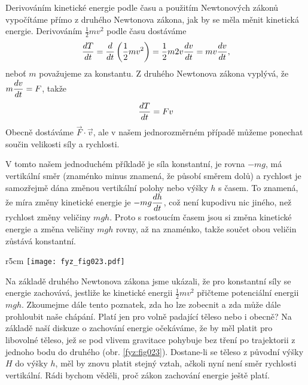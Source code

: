     Derivováním kinetické energie podle času a použitím Newtonových zákonů vypočítáme přímo z 
    druhého Newtonova zákona, jak by se měla měnit kinetická energie. Derivováním 
    \(\frac{1}{2}mv^2\) podle času dostáváme
    \begin{equation}\label{FYZ:eq026}
      \dfrac{d T}{d t} = \dfrac{d  }{d t}\left(\frac{1}{2}mv^2\right) = \frac{1}{2}m2v\dfrac{d v}{d t} 
                 = mv\dfrac{d v}{d t},
    \end{equation}
    neboť \(m\) považujeme za konstantu. Z druhého Newtonova zákona vyplývá, že \(m\dfrac{d v}{d t} = 
    F\), takže
    \begin{equation}\label{FYZ:eq027}
      \dfrac{d T}{d t} =Fv
    \end{equation}
    Obecně dostáváme \(\vec{F}\cdot\vec{v}\), ale v našem jednorozměrném případě můžeme ponechat 
    součin velikosti síly a rychlosti. 
    
    V tomto našem jednoduchém příkladě je síla konstantní, je rovna \(- mg\), má vertikální směr 
    (znaménko minus znamená, že působí směrem dolů) a rychlost je samozřejmě dána změnou vertikální 
    polohy nebo výšky \(h\) s časem. To znamená, že míra změny kinetické energie je \(- 
    mg\dfrac{d h}{d t}\), což není kupodivu nic jiného, než rychlost změny veličiny \(mgh\). Proto s 
    rostoucím časem jsou si změna kinetické energie a změna veličiny \(mgh\) rovny, až na znaménko, 
    takže součet obou veličin zůstává konstantní.
    
    \begin{wrapfigure}[14]{r}{5cm}  %
      \centering
      \texttt{[image: fyz\_fig023.pdf]}
      \caption{Těleso pohybující se bez tření po zakřivené trajektorii pod vlivem gravitační síly
               (\cite[s.~186]{Feynman01})}
      \label{fyz:fig023}
    \end{wrapfigure}
    Na základě druhého Newtonova zákona jsme ukázali, že pro konstantní síly se energie zachovává, 
    jestliže ke kinetické energii \(\frac{1}{2}mv^2\) přičteme potenciální energii \(mgh\). 
    Zkoumejme dále tento poznatek, zda ho lze zobecnit a zda může dále prohloubit naše chápání. 
    Platí jen pro volně padající těleso nebo i obecně? Na základě naší diskuze o zachování energie 
    očekáváme, že by měl platit pro libovolné těleso, jež se pod vlivem gravitace pohybuje bez 
    tření po trajektorii z jednoho bodu do druhého (obr. \ref{fyz:fig023}). Dostane-li se těleso z 
    původní výšky \(H\) do výšky \(h\), měl by znovu platit stejný vztah, ačkoli nyní není směr 
    rychlosti vertikální. Rádi bychom věděli, proč zákon zachování energie ještě platí.
    
